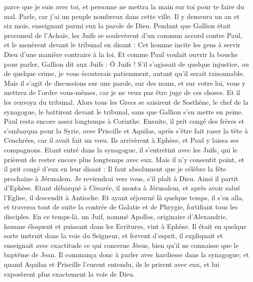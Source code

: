 \begin{multicols}{2}
parce que je suis avec toi, et personne ne mettra la main sur toi pour te faire du mal. Parle, car j'ai un peuple nombreux dans cette ville.
Il y demeura un an et six mois, enseignant parmi eux la parole de Dieu.
Pendant que Gallion était proconsul de l’Achaïe, les Juifs se soulevèrent d'un commun accord contre Paul, et le menèrent devant le tribunal
en disant : Cet homme incite les gens à servir Dieu d’une manière contraire à la loi.
Et comme Paul voulait ouvrir la bouche pour parler, Gallion dit aux Juifs : Ô Juifs ! S’il s’agissait de quelque injustice, ou de quelque crime, je vous écouterais patiemment, autant qu’il serait raisonnable.
Mais il s’agit de discussions sur une parole, sur des noms, et sur votre loi, vous y mettrez de l’ordre vous-mêmes, car je ne veux pas être juge de ces choses.
Et il les renvoya du tribunal.
Alors tous les Grecs se saisirent de Sosthène, le chef de la synagogue, le battirent devant le tribunal, sans que Gallion s'en mette en peine.
Paul resta encore assez longtemps à Corinthe. Ensuite, il prit congé des frères et s’embarqua pour la Syrie, avec Priscille et Aquilas, après s’être fait raser la tête à Cenchrées, car il avait fait un vœu.
Ils arrivèrent à Ephèse, et Paul y laissa ses compagnons. Etant entré dans la synagogue, il s’entretint avec les Juifs,
qui le prièrent de rester encore plus longtemps avec eux.
Mais il n’y consentit point, et il prit congé d'eux en leur disant : Il faut absolument que je célèbre la fête prochaine à Jérusalem. Je reviendrai vers vous, s'il plaît à Dieu. Ainsi il partit d'Ephèse.
Etant débarqué à Césarée, il monta à Jérusalem, et après avoir salué l'Eglise, il descendit à Antioche.
Et ayant séjourné là quelque temps, il s'en alla, et traversa tout de suite la contrée de Galatie et de Phrygie, fortifiant tous les disciples.
En ce temps-là, un Juif, nommé Apollos, originaire d’Alexandrie, homme éloquent et puissant dans les Ecritures, vint à Ephèse.
Il était en quelque sorte instruit dans la voie du Seigneur, et fervent d’esprit, il expliquait et enseignait avec exactitude ce qui concerne Jésus, bien qu’il ne connaisse que le baptême de Jean.
Il commança donc à parler avec hardiesse dans la synagogue; et quand Aquilas et Priscille l'eurent entendu, ils le prirent avec eux, et lui exposèrent plus exactement la voie de Dieu.

\end{multicols}

